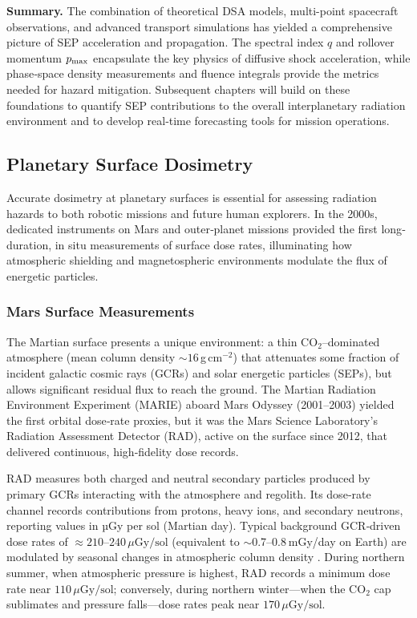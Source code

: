 \documentclass[12pt]{report}
\begin{document}
\vspace{1em}
\noindent\textbf{Summary.}  The combination of theoretical DSA models, multi-point spacecraft observations, and advanced transport simulations has yielded a comprehensive picture of SEP acceleration and propagation.  The spectral index $q$ and rollover momentum $p_{\rm max}$ encapsulate the key physics of diffusive shock acceleration, while phase‐space density measurements and fluence integrals provide the metrics needed for hazard mitigation.  Subsequent chapters will build on these foundations to quantify SEP contributions to the overall interplanetary radiation environment and to develop real‐time forecasting tools for mission operations.


\subsection{Planetary Surface Dosimetry}

Accurate dosimetry at planetary surfaces is essential for assessing radiation hazards to both robotic missions and future human explorers.  In the 2000s, dedicated instruments on Mars and outer‐planet missions provided the first long‐duration, in situ measurements of surface dose rates, illuminating how atmospheric shielding and magnetospheric environments modulate the flux of energetic particles.

\subsubsection{Mars Surface Measurements}

The Martian surface presents a unique environment: a thin CO$_2$–dominated atmosphere (mean column density $\sim 16\,$g\,cm$^{-2}$) that attenuates some fraction of incident galactic cosmic rays (GCRs) and solar energetic particles (SEPs), but allows significant residual flux to reach the ground.  The Martian Radiation Environment Experiment (MARIE) aboard Mars Odyssey (2001–2003) yielded the first orbital dose‐rate proxies, but it was the Mars Science Laboratory’s Radiation Assessment Detector (RAD), active on the surface since 2012, that delivered continuous, high‐fidelity dose records.

RAD measures both charged and neutral secondary particles produced by primary GCRs interacting with the atmosphere and regolith.  Its dose‐rate channel records contributions from protons, heavy ions, and secondary neutrons, reporting values in µGy per sol (Martian day).  Typical background GCR‐driven dose rates of $\approx 210\text{–}240\,\mu\mathrm{Gy/sol}$ (equivalent to $\sim$0.7–0.8 mGy/day on Earth) are modulated by seasonal changes in atmospheric column density \cite{hassler2014mars}.  During northern summer, when atmospheric pressure is highest, RAD records a minimum dose rate near $110\,\mu\mathrm{Gy/sol}$; conversely, during northern winter—when the CO$_2$ cap sublimates and pressure falls—dose rates peak near $170\,\mu\mathrm{Gy/sol}$.
\end{document}
